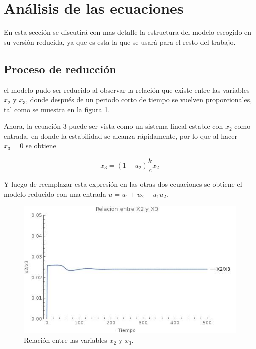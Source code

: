 \documentclass{article}
\begin{document}
\section{Análisis de las ecuaciones}

En esta sección se discutirá con mas detalle la estructura del modelo escogido
en su versión reducida, ya que es esta la que se usará para el resto del trabajo.

    \subsection{Proceso de reducción}

    el modelo pudo ser reducido al observar la relación que existe
    entre las variables $x_2$ y $x_3$, donde después de un periodo corto de
    tiempo se vuelven proporcionales, tal como se muestra en la figura \ref{fig:relacion}.

    Ahora, la ecuación 3 puede ser vista como un sistema lineal estable con
    $x_2$ como entrada, en donde la estabilidad se alcanza rápidamente, por lo
    que al hacer $\dot{x_3} = 0$ se obtiene

    \Large
    $$x_3 = (1-u_2) \frac{k}{c} x_2$$
    \normalsize

    Y luego de reemplazar esta expresión en las otras dos ecuaciones se obtiene el
    modelo reducido con una entrada $u = u_1 + u_2 - u_1 u_2$.

    \begin{figure}[h!]
        \centering
        \includegraphics[scale=0.5]{Images/Vih-x2-x3}
        \caption{Relación entre las variables $x_2$ y $x_3$.}
        \label{fig:relacion}
    \end{figure}

    \newpage
\end{document}
